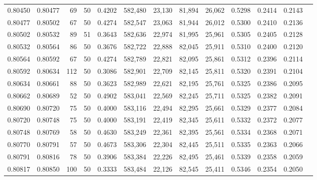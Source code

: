 \begin{tabular}{rrrrrrrrrrrrr}
0.80450 & 0.80477 &    69 &  50 &                                     0.4202 & 582,480 &  23,130 &  81,894 &  26,062 & 0.5298 & 0.2414 & 0.2143 \\
0.80477 & 0.80502 &    67 &  50 &                                     0.4274 & 582,547 &  23,063 &  81,944 &  26,012 & 0.5300 & 0.2410 & 0.2136 \\
0.80502 & 0.80532 &    89 &  51 &                                     0.3643 & 582,636 &  22,974 &  81,995 &  25,961 & 0.5305 & 0.2405 & 0.2128 \\
0.80532 & 0.80564 &    86 &  50 &                                     0.3676 & 582,722 &  22,888 &  82,045 &  25,911 & 0.5310 & 0.2400 & 0.2120 \\
0.80564 & 0.80592 &    67 &  50 &                                     0.4274 & 582,789 &  22,821 &  82,095 &  25,861 & 0.5312 & 0.2396 & 0.2114 \\
0.80592 & 0.80634 &   112 &  50 &                                     0.3086 & 582,901 &  22,709 &  82,145 &  25,811 & 0.5320 & 0.2391 & 0.2104 \\
0.80634 & 0.80661 &    88 &  50 &                                     0.3623 & 582,989 &  22,621 &  82,195 &  25,761 & 0.5325 & 0.2386 & 0.2095 \\
0.80662 & 0.80689 &    52 &  50 &                                     0.4902 & 583,041 &  22,569 &  82,245 &  25,711 & 0.5325 & 0.2382 & 0.2091 \\
0.80690 & 0.80720 &    75 &  50 &                                     0.4000 & 583,116 &  22,494 &  82,295 &  25,661 & 0.5329 & 0.2377 & 0.2084 \\
0.80720 & 0.80748 &    75 &  50 &                                     0.4000 & 583,191 &  22,419 &  82,345 &  25,611 & 0.5332 & 0.2372 & 0.2077 \\
0.80748 & 0.80769 &    58 &  50 &                                     0.4630 & 583,249 &  22,361 &  82,395 &  25,561 & 0.5334 & 0.2368 & 0.2071 \\
0.80770 & 0.80791 &    57 &  50 &                                     0.4673 & 583,306 &  22,304 &  82,445 &  25,511 & 0.5335 & 0.2363 & 0.2066 \\
0.80791 & 0.80816 &    78 &  50 &                                     0.3906 & 583,384 &  22,226 &  82,495 &  25,461 & 0.5339 & 0.2358 & 0.2059 \\
0.80817 & 0.80850 &   100 &  50 &                                     0.3333 & 583,484 &  22,126 &  82,545 &  25,411 & 0.5346 & 0.2354 & 0.2050 \\

\end{tabular}
